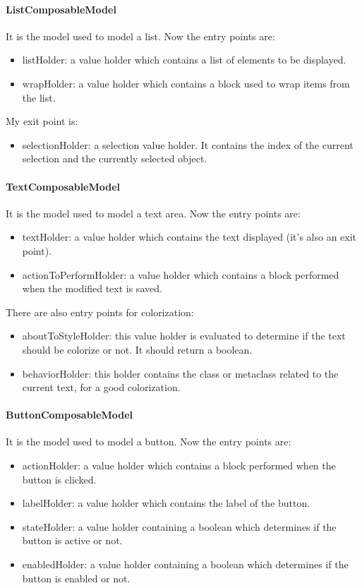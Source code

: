 \documentclass[a4paper,10pt,twoside]{book}
\begin{document}
\paragraph{ListComposableModel} It is the model used to model a list.
Now the entry points are:
\begin{itemize}
	\item listHolder: a value holder which contains a list of elements to be displayed.
	\item wrapHolder: a value holder which contains a block used to wrap items from the list.
\end{itemize}
My exit point is:
\begin{itemize}
	\item selectionHolder: a selection value holder. It contains the index of the current selection and the currently selected object.
\end{itemize}

\paragraph{TextComposableModel} It is the model used to model a text area.
Now the entry points are:
\begin{itemize}
	\item textHolder: a value holder which contains the text displayed (it's also an exit point).
	\item actionToPerformHolder: a value holder which contains a block performed when the modified text is saved.
\end{itemize}
There are also entry points for colorization:
\begin{itemize}	
	\item aboutToStyleHolder: this value holder is evaluated to determine if the text should be colorize or not. It should return a boolean.
	\item behaviorHolder: this holder contains the class or metaclass related to the current text, for a good colorization.
\end{itemize}

\paragraph{ButtonComposableModel} It is the model used to model a button.
Now the entry points are:
\begin{itemize}
	\item actionHolder: a value holder which contains a block performed when the button is clicked.
	\item labelHolder: a value holder which contains the label of the button.
	\item stateHolder: a value holder containing a boolean which determines if the button is active or not.
	\item enabledHolder: a value holder containing a boolean which determines if the button is enabled or not.
	\end{itemize}
	
\end{document}
